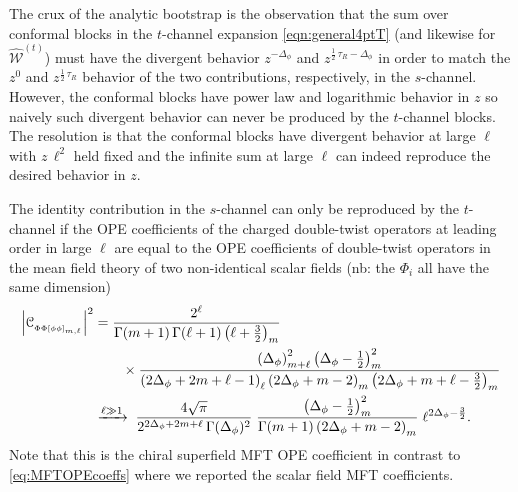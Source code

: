 \documentclass[11pt]{article}
\newcommand{\cope}[1]{\mathcal{C}_{_{#1}}}
\begin{document}
The crux of the analytic bootstrap is the observation that the sum over conformal blocks in the $t$-channel expansion \eqref{eqn:general4ptT} (and likewise for $\widehat{\mathcal{W}}^{(t)}$) must have the divergent behavior $z^{-\Delta_{\phi}}$ and $z^{\frac{1}{2}\, \tau_{\scriptscriptstyle{R}}-\Delta_{\phi}}$ in order to match the $z^{0}$ and $z^{\frac{1}{2}\, \tau_{\scriptscriptstyle{R}}}$ behavior of the two contributions, respectively, in the $s$-channel. However, the conformal blocks have power law and logarithmic behavior in $z$ so naively such divergent behavior can never be produced by the $t$-channel blocks. The resolution is that the conformal blocks have divergent behavior at large $\ell$ with $z\,\ell^2$ held fixed and the infinite sum at large $\ell$ can indeed reproduce the desired behavior in $z$. 

The identity contribution in the $s$-channel can only be reproduced by the $t$-channel if the OPE coefficients of the charged double-twist operators at leading order in large $\ell$ are equal to the OPE coefficients of double-twist operators in the mean field theory of two non-identical scalar fields (nb: the $\Phi_i$ all have the same  dimension) 
%
\begin{equation}\label{eq:MFTOPEcoeffs_scalar}
\begin{split}
\abs{\cope{\Phi\Phi[\phi\phi]_{m,\ell}}}^{2} 
&= 
  \frac{2^{\ell} }{\Gamma(m+1)\,\Gamma(\ell+1)   \left(\ell+\frac{3}{2}\right)_{m} } \\
 & \qquad
  \times 
    \frac{ \left(\Delta_{\phi}\right)_{m+\ell}^{2} \left(\Delta_{\phi}-\frac{1}{2}\right)_{m}^{2}}{  \left(2\Delta_{\phi}+2m+\ell-1\right)_{\ell}   \left(2\Delta_{\phi}+m-2\right)_{m} \left(2\Delta_{\phi}+m+\ell-\frac{3}{2}\right)_{m}} \\   
&
  \xrightarrow{\ell \gg 1} \; \frac{4\sqrt{\pi}}{2^{2\Delta_{\phi}+2m+\ell}\,\Gamma(\Delta_{\phi})^{2}} \; 
    \frac{\left(\Delta_{\phi}-\frac{1}{2}\right)_{m}^{2}}{\Gamma(m+1) \left(2\Delta_{\phi}+m-2\right)_{m}} \; \ell^{2\Delta_{\phi}-\frac{3}{2}}.
\end{split}
\end{equation}
%
Note that this is the chiral superfield MFT OPE coefficient in contrast to \eqref{eq:MFTOPEcoeffs} where we reported the scalar field MFT  coefficients. 
\end{document}
